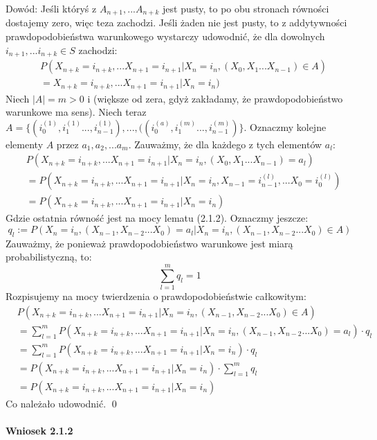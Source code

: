 \documentclass[a4paper]{article}
\begin{document}
Dowód: Jeśli któryś z $A_{n+1}, ... A_{n+k}$ jest pusty, to po obu stronach równości dostajemy zero, więc teza zachodzi. Jeśli żaden nie jest pusty, to z addytywności prawdopodobieństwa warunkowego wystarczy udowodnić, że dla dowolnych $i_{n+1}, ... i_{n+k} \in S$ zachodzi:
\begin{align*}
&P(X_{n+k} = i_{n+k}, ...X_{n+1} = i_{n+1} |X_n = i_n, (X_{0}, X_{1} ... X_{n-1}) \in A)\\
&= X_{n+k} = i_{n+k}, ...X_{n+1} = i_{n+1} |X_n = i_n)
\end{align*}
Niech $|A| = m > 0$ i (większe od zera, gdyż zakładamy, że prawdopodobieństwo warunkowe ma sens). Niech teraz $A = \{(i_0^{(1)}, i_1^{(1)}..., i_{n-1}^{(1)}), ..., ((i_0^{(a)}, i_1^{(m)}..., i_{n-1}^{(m)})\}$. Oznaczmy kolejne elementy $A$ przez $a_1, a_2, ... a_m$.
Zauważmy, że dla każdego z tych elementów $a_l$:
\begin{align*}
    &P(X_{n+k} = i_{n+k}, ...X_{n+1} = i_{n+1} |X_n = i_n, (X_{0}, X_{1} ... X_{n-1}) = a_l) \\
    &= P(X_{n+k} = i_{n+k}, ...X_{n+1} = i_{n+1} |X_n = i_n, X_{n-1} = i_{n-1}^{(l)}, ... X_0 = i_{0}^{(l)})\\
    &= P(X_{n+k} = i_{n+k}, ...X_{n+1} = i_{n+1} |X_n = i_n)
\end{align*}
Gdzie ostatnia równość jest na mocy lematu (2.1.2). Oznaczmy jeszcze:
$$ q_l :=P(X_n = i_n, (X_{n-1}, X_{n-2} ... X_0) = a_l|X_n = i_n, (X_{n-1}, X_{n-2} ... X_0) \in A)$$
Zauważmy, że ponieważ prawdopodobieństwo warunkowe jest miarą probabilistyczną, to:
$$\sum\limits_{l = 1}^m q_l = 1$$
Rozpisujemy na mocy twierdzenia o prawdopodobieństwie całkowitym:
\begin{align*}
    &P(X_{n+k} = i_{n+k}, ...X_{n+1} = i_{n+1} |X_n = i_n, (X_{n-1}, X_{n-2} ... X_0) \in A) \\
    &= \sum\limits_{l = 1}^m  P(X_{n+k} = i_{n+k}, ...X_{n+1} = i_{n+1} |X_n = i_n, (X_{n-1}, X_{n-2} ... X_0) = a_l)\cdot q_l\\
    &= \sum\limits_{l = 1}^m  P(X_{n+k} = i_{n+k}, ...X_{n+1} = i_{n+1} |X_n = i_n)\cdot q_l\\
    &= P(X_{n+k} = i_{n+k}, ...X_{n+1} = i_{n+1} |X_n = i_n) \cdot \sum\limits_{l = 1}^m q_l \\
    &= P(X_{n+k} = i_{n+k}, ...X_{n+1} = i_{n+1} |X_n = i_n)
\end{align*}
Co należało udowodnić. \qed
\\\\
\textbf{Wniosek 2.1.2}\\
\end{document}
